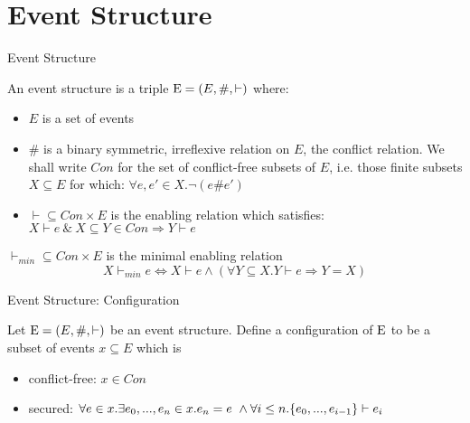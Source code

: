 \section{Event Structure}

\begin{frame}{Event Structure}
    \begin{definition}
        An event structure is a triple $\mathrm{E} = (E,\#,\vdash)$ where:
        \begin{itemize}
            \item $E$ is a set of events
            \item \# is a binary symmetric, irreflexive relation on $E$,
                  the conflict relation.
                  We shall write $Con$ for the set of conflict-free subsets of $E$,
                  i.e. those finite subsets $X \subseteq E$ for which:
                  $\forall e,e' \in X . \neg (e\#e')$
            \item $\vdash \subseteq Con \times E$ is the enabling relation which satisfies:
                  $ X \vdash e \ \& \ X \subseteq Y \in Con \Rightarrow Y \vdash e$
        \end{itemize}
    \end{definition}
    $\vdash_{min} \subseteq Con \times E$ is the minimal enabling relation
    \begin{equation*}
        X \vdash_{min} e \iff X \vdash e \wedge
        ( \forall Y \subseteq X . Y \vdash e \Rightarrow Y = X )
    \end{equation*}
\end{frame}

\begin{frame}{Event Structure: Configuration}
    \begin{definition}[Configuration]
        \label{conf}
        Let $\mathrm{E} = (E,\#,\vdash)$ be an event structure.
        Define a configuration of $\mathrm{E}$ to be a subset of events $x \subseteq E$ which is
        \begin{itemize}
            \item conflict-free: $x \in Con$
            \item secured: $\forall e \in x. \exists e_0,...,e_n \in x. e_n = e \ \wedge
                      \forall i \leq n. \{e_0,...,e_{i-1}\} \vdash e_i$
        \end{itemize}
    \end{definition}
\end{frame}


